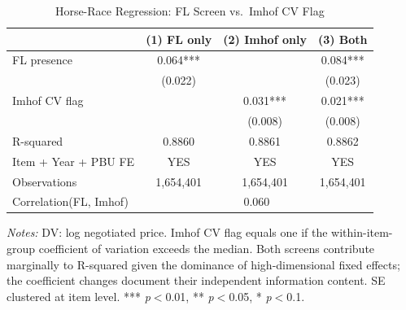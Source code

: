 \begin{table}[htbp]
\centering
\caption{Horse-Race Regression: FL Screen vs.\ Imhof CV Flag}
\label{tab:horse_race}
\begin{threeparttable}
\small
\begin{tabular}{lccc}
\toprule
 & (1) FL only & (2) Imhof only & (3) Both \\
\midrule
FL presence & 0.064*** &  & 0.084*** \\
 & (0.022) &  & (0.023) \\
Imhof CV flag &  & 0.031*** & 0.021*** \\
 &  & (0.008) & (0.008) \\
\midrule
R-squared & 0.8860 & 0.8861 & 0.8862 \\
Item + Year + PBU FE & YES & YES & YES \\
Observations & 1{,}654{,}401 & 1{,}654{,}401 & 1{,}654{,}401 \\
Correlation(FL, Imhof) & \multicolumn{3}{c}{0.060} \\
\bottomrule
\end{tabular}
\begin{tablenotes}
\small
\item \textit{Notes:} DV: log negotiated price. Imhof CV flag equals one
if the within-item-group coefficient of variation exceeds the median.
Both screens contribute marginally to R-squared given the dominance of
high-dimensional fixed effects; the coefficient changes document their
independent information content.
SE clustered at item level.
*** \textit{p}$<$0.01, ** \textit{p}$<$0.05, * \textit{p}$<$0.1.
\end{tablenotes}
\end{threeparttable}
\end{table}
